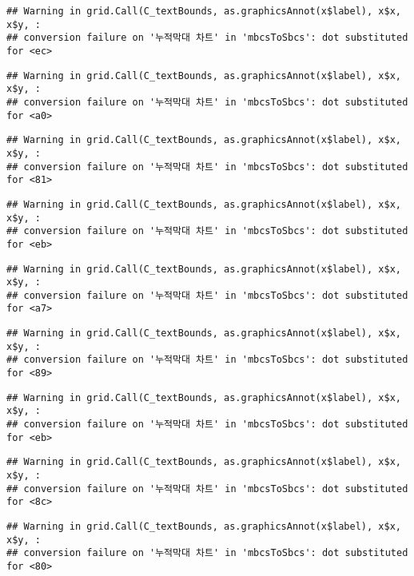 \documentclass[
]{article}
\begin{document}
\begin{verbatim}
## Warning in grid.Call(C_textBounds, as.graphicsAnnot(x$label), x$x, x$y, :
## conversion failure on '누적막대 차트' in 'mbcsToSbcs': dot substituted for <ec>
\end{verbatim}

\begin{verbatim}
## Warning in grid.Call(C_textBounds, as.graphicsAnnot(x$label), x$x, x$y, :
## conversion failure on '누적막대 차트' in 'mbcsToSbcs': dot substituted for <a0>
\end{verbatim}

\begin{verbatim}
## Warning in grid.Call(C_textBounds, as.graphicsAnnot(x$label), x$x, x$y, :
## conversion failure on '누적막대 차트' in 'mbcsToSbcs': dot substituted for <81>
\end{verbatim}

\begin{verbatim}
## Warning in grid.Call(C_textBounds, as.graphicsAnnot(x$label), x$x, x$y, :
## conversion failure on '누적막대 차트' in 'mbcsToSbcs': dot substituted for <eb>
\end{verbatim}

\begin{verbatim}
## Warning in grid.Call(C_textBounds, as.graphicsAnnot(x$label), x$x, x$y, :
## conversion failure on '누적막대 차트' in 'mbcsToSbcs': dot substituted for <a7>
\end{verbatim}

\begin{verbatim}
## Warning in grid.Call(C_textBounds, as.graphicsAnnot(x$label), x$x, x$y, :
## conversion failure on '누적막대 차트' in 'mbcsToSbcs': dot substituted for <89>
\end{verbatim}

\begin{verbatim}
## Warning in grid.Call(C_textBounds, as.graphicsAnnot(x$label), x$x, x$y, :
## conversion failure on '누적막대 차트' in 'mbcsToSbcs': dot substituted for <eb>
\end{verbatim}

\begin{verbatim}
## Warning in grid.Call(C_textBounds, as.graphicsAnnot(x$label), x$x, x$y, :
## conversion failure on '누적막대 차트' in 'mbcsToSbcs': dot substituted for <8c>
\end{verbatim}

\begin{verbatim}
## Warning in grid.Call(C_textBounds, as.graphicsAnnot(x$label), x$x, x$y, :
## conversion failure on '누적막대 차트' in 'mbcsToSbcs': dot substituted for <80>
\end{verbatim}
\end{document}
